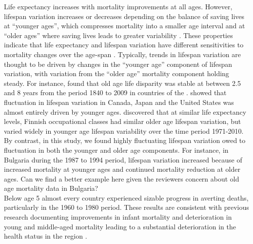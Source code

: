 \documentclass{article}
\begin{document}
\begin{spacing}{1.5}
Life expectancy increases with mortality improvements at all ages. However, lifespan variation increases or decreases depending on the balance of saving lives at ``younger ages'', which compresses mortality into a smaller age interval and at ``older ages'' where saving lives leads to greater variability \citep{zhang2009, gillespie2014divergence}. These properties indicate that life expectancy and lifespan variation have different sensitivities to mortality changes over the age-span \citep{vanraalte2013}. Typically, trends in lifespan variation are thought to be driven by changes in the ``younger age'' component of lifespan variation, with variation from the ``older age'' mortality component holding steady. For instance, \citet{vaupel2011} found that old age life disparity was stable at between 2.5 and 8 years from the period 1840 to 2009 in countries of the \cite{HMD}. \citet{gillespie2014divergence} showed that fluctuation in lifespan variation in Canada, Japan and the United States was almost entirely driven by younger ages. \citet{vanraalte2014} discovered that at similar life expectancy levels, Finnish occupational classes had similar older age lifespan variation, but varied widely in younger age lifespan variability over the time period 1971-2010.  By contrast, in this study, we found highly fluctuating lifespan variation owed to fluctuation in both the younger and older age components. \textcolor[rgb]{1,0,0}{For instance, in Bulgaria during the 1987 to 1994 period, lifespan variation increased because of increased mortality at younger ages and continued mortality reduction at older ages. Can we find a better example here given the reviewers concern about old age mortality data in Bulgaria?} \\

Below age 5 almost every country experienced sizable progress in averting deaths, particularly in the 1960 to 1980 period. These results are consistent with previous research documenting improvements in infant mortality and deterioration in young and middle-aged mortality leading to a substantial deterioration in the health status in the region \citep{chenet1996}. \\


\end{spacing}
\end{document}
